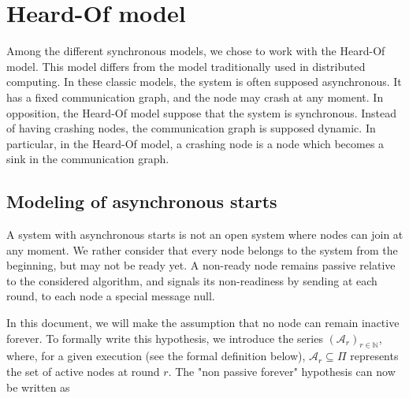 \documentclass{article}
\begin{document}
\section{Heard-Of model}

Among the different synchronous models, we chose to work with the Heard-Of model.
This model differs from the model traditionally used in distributed computing.
In these classic models, the system is often supposed asynchronous. It has a fixed communication graph, and the node may crash at any moment.
In opposition, the Heard-Of model suppose that the system is synchronous. Instead of having crashing nodes, the communication graph is supposed dynamic.
In particular, in the Heard-Of model, a crashing node is a node which becomes a sink in the communication graph.



\subsection{Modeling of asynchronous starts}

A system with asynchronous starts is not an open system where nodes can join at any moment.
We rather consider that every node belongs to the system from the beginning, but may not be ready yet.
A non-ready node remains passive relative to the considered algorithm, and signals its non-readiness by sending at each round, to each node a special message null.

In this document, we will make the assumption that no node can remain inactive forever.
To formally write this hypothesis, we introduce the series $(\mathcal{A}_r)_{r \in \mathds{N}}$, where, for a given execution (see the formal definition below), $\mathcal{A}_r \subseteq \Pi$ 
represents the set of active nodes at round $r$.
The "non passive forever" hypothesis can now be written as
\end{document}
